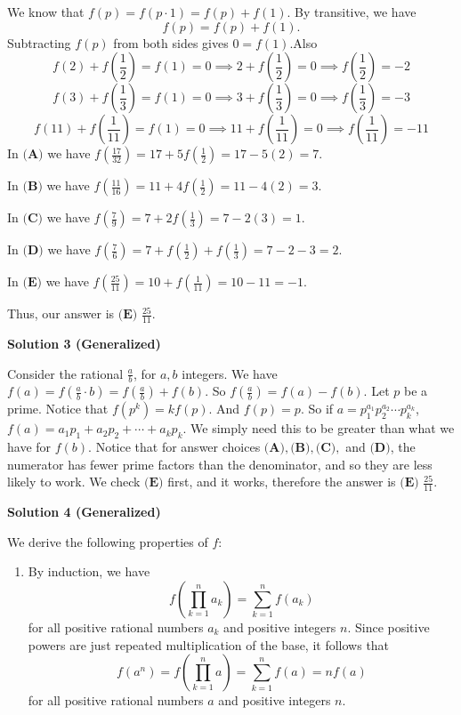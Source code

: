 \begin{enumerate}
We know that $f(p) = f(p \cdot 1) = f(p) + f(1)$. By transitive, we have 
 \[f(p) = f(p) + f(1).\]Subtracting $f(p)$ from both sides gives $0 = f(1).$Also
 \[f(2)+f\left(\frac{1}{2}\right)=f(1)=0 \implies 2+f\left(\frac{1}{2}\right)=0 \implies f\left(\frac{1}{2}\right) = -2\]
 \[f(3)+f\left(\frac{1}{3}\right)=f(1)=0 \implies 3+f\left(\frac{1}{3}\right)=0 \implies f\left(\frac{1}{3}\right) = -3\]
 \[f(11)+f\left(\frac{1}{11}\right)=f(1)=0 \implies 11+f\left(\frac{1}{11}\right)=0 \implies f\left(\frac{1}{11}\right) = -11\]In $\textbf{(A)}$ we have $f\left(\frac{17}{32}\right)=17+5f\left(\frac{1}{2}\right)=17-5(2)=7$.

 In $\textbf{(B)}$ we have $f\left(\frac{11}{16}\right)=11+4f\left(\frac{1}{2}\right)=11-4(2)=3$.

 In $\textbf{(C)}$ we have $f\left(\frac{7}{9}\right)=7+2f\left(\frac{1}{3}\right)=7-2(3)=1$.

 In $\textbf{(D)}$ we have $f\left(\frac{7}{6}\right)=7+f\left(\frac{1}{2}\right)+f\left(\frac{1}{3}\right)=7-2-3=2$.

 In $\textbf{(E)}$ we have $f\left(\frac{25}{11}\right)=10+f\left(\frac{1}{11}\right)=10-11=-1$.

 Thus, our answer is $\boxed{\textbf{(E) }\frac{25}{11}}$.

 



\textbf{Solution 3 (Generalized)}

Consider the rational $\frac{a}{b}$, for $a,b$ integers. We have $f(a)=f\left(\frac{a}{b}\cdot b\right)=f\left(\frac{a}{b}\right)+f(b)$. So $f\left(\frac{a}{b}\right)=f(a)-f(b)$. Let $p$ be a prime. Notice that $f(p^k)=kf(p)$. And $f(p)=p$. So if $a=p_1^{a_1}p_2^{a_2}\cdots p_k^{a_k}$, $f(a)=a_1p_1+a_2p_2+\cdots+a_kp_k$. We simply need this to be greater than what we have for $f(b)$. Notice that for answer choices $\textbf{(A)},\textbf{(B)},\textbf{(C)},$ and $\textbf{(D)}$, the numerator has fewer prime factors than the denominator, and so they are less likely to work. We check $\textbf{(E)}$ first, and it works, therefore the answer is $\boxed{\textbf{(E) }\frac{25}{11}}$.  

 



\textbf{Solution 4 (Generalized)}

We derive the following properties of $f:$

            \begin{enumerate} 
        \item By induction, we have 
 \[f\left(\prod_{k=1}^{n}a_k\right)=\sum_{k=1}^{n}f(a_k)\] for all positive rational numbers $a_k$ and positive integers $n.$ Since positive powers are just repeated multiplication of the base, it follows that 
 \[f\left(a^n\right)=f\left(\prod_{k=1}^{n}a\right)=\sum_{k=1}^{n}f(a)=nf(a)\] for all positive rational numbers $a$ and positive integers $n.$



\end{enumerate}
\end{enumerate}
